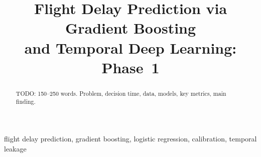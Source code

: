 \documentclass[conference]{IEEEtran}
\begin{document}
\title{Flight Delay Prediction via Gradient Boosting\\ and Temporal Deep Learning: Phase~1}

\author{
}

\maketitle

\begin{abstract}
TODO: 150--250 words. Problem, decision time, data, models, key metrics, main finding.
\end{abstract}

\begin{IEEEkeywords}
flight delay prediction, gradient boosting, logistic regression, calibration, temporal leakage
\end{IEEEkeywords}












\end{document}
